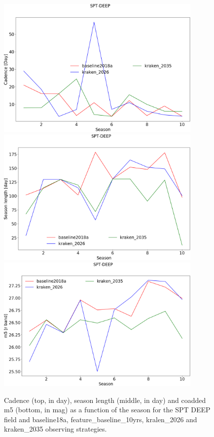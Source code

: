 

\begin{figure}[htbp]
\begin{center}
  \includegraphics[width=10cm]{Figures/SPT-DEEP_cadence.png}
  \includegraphics[width=10cm]{Figures/SPT-DEEP_season_length.png}
  \includegraphics[width=10cm]{Figures/SPT-DEEP_m5.png}
 \caption{Cadence (top, in day), season length (middle, in day) and coadded m5 (bottom, in mag) as a function of the season for the SPT DEEP field and baseline18a, feature\_baseline\_10yrs, kralen\_2026 and kraken\_2035 observing strategies.}\label{fig:spt deep_cad}
\end{center}
\end{figure}

